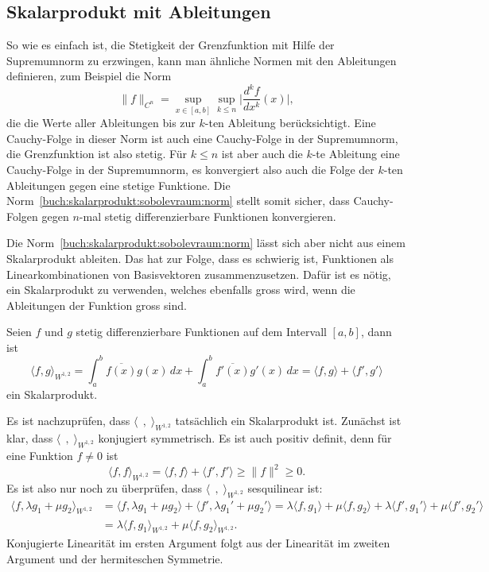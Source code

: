 \subsection{Skalarprodukt mit Ableitungen}
So wie es einfach ist, die Stetigkeit der Grenzfunktion mit Hilfe
der Supremumnorm zu erzwingen, kann man ähnliche Normen mit den
Ableitungen definieren, zum Beispiel die Norm
\begin{equation}
\|f\|_{C^n}
=
\sup_{x\in [a,b]}\sup_{k\le n} \biggl|\frac{d^kf}{dx^k}(x)\biggr|,
\label{buch:skalarprodukt:sobolevraum:norm}
\end{equation}
die die Werte aller Ableitungen bis zur $k$-ten Ableitung berücksichtigt.
Eine Cauchy-Folge in dieser Norm ist auch eine Cauchy-Folge in der
Supremumnorm, die Grenzfunktion ist also stetig.
Für $k\le n$ ist aber auch die $k$-te Ableitung eine Cauchy-Folge
in der Supremumnorm, es konvergiert also auch die Folge der $k$-ten
Ableitungen gegen eine stetige Funktione.
Die Norm~\eqref{buch:skalarprodukt:sobolevraum:norm} stellt somit sicher,
dass Cauchy-Folgen gegen $n$-mal stetig differenzierbare Funktionen
konvergieren.

Die Norm~\eqref{buch:skalarprodukt:sobolevraum:norm} lässt sich aber
nicht aus einem Skalarprodukt ableiten.
Das hat zur Folge, dass es schwierig ist, Funktionen als Linearkombinationen
von Basisvektoren zusammenzusetzen.
Dafür ist es nötig, ein Skalarprodukt zu verwenden, welches ebenfalls
gross wird, wenn die Ableitungen der Funktion gross sind.

\begin{definition}[$W^{1,2}$-Skalarprodukt]
Seien $f$ und $g$ stetig differenzierbare Funktionen auf dem Intervall
$[a,b]$, dann ist
\begin{equation}
\langle f,g\rangle_{W^{1,2}}
=
\int_a^b \overline{f(x)} g(x)\,dx
+
\int_a^b \overline{f'(x)} g'(x)\,dx
=
\langle f, g\rangle
+
\langle f',g'\rangle
\label{buch:skalarprodukt:sobolevraum:eqn:W12produkt}
\end{equation}
ein Skalarprodukt.
\end{definition}

Es ist nachzuprüfen, dass $\langle\;\,,\;\rangle_{W^{1,2}}$ tatsächlich ein
Skalarprodukt ist.
Zunächst ist klar, dass $\langle\;\,,\;\rangle_{W^{1,2}}$ konjugiert
symmetrisch.
Es ist auch positiv definit, denn für eine Funktion $f\ne 0$
ist
\[
\langle f,f\rangle_{W^{1,2}}
=
\langle f,f\rangle + \langle f',f'\rangle
\ge
\|f\|^2
\ge
0.
\]
Es ist also nur noch zu überprüfen, dass $\langle\;\,,\;\rangle_{W^{1,2}}$ 
sesquilinear ist:
\begin{align*}
\langle f,\lambda g_1+\mu g_2\rangle_{W^{1,2}}
&=
\langle f,\lambda g_1+\mu g_2\rangle + \langle f',\lambda g_1'+\mu g_2'\rangle
=
\lambda \langle f,g_1\rangle
+
\mu \langle f,g_2\rangle
+
\lambda \langle f',g_1'\rangle
+
\mu \langle f',g_2'\rangle
\\
&=
\lambda \langle f,g_1\rangle_{W^{1,2}}
+
\mu \langle f,g_2\rangle_{W^{1,2}}.
\end{align*}
Konjugierte Linearität im ersten Argument folgt aus der Linearität
im zweiten Argument und der hermiteschen Symmetrie.

